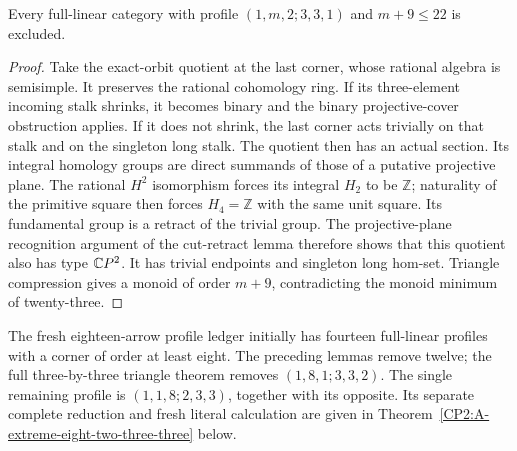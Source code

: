 \begin{proposition}
\label{CP2:A-three-three-two-endpoint}
Every full-linear category with profile
$(1,m,2;3,3,1)$ and $m+9\leq22$ is excluded.
\end{proposition}
\begin{proof}
Take the exact-orbit quotient at the last corner,
whose rational algebra is semisimple. It preserves
the rational cohomology ring. If its three-element
incoming stalk shrinks, it becomes binary and the
binary projective-cover obstruction applies. If
it does not shrink, the last corner acts trivially
on that stalk and on the singleton long stalk.
The quotient then has an actual section. Its integral
homology groups are direct summands of those of a
putative projective plane. The rational $H^2$
isomorphism forces its integral $H_2$ to be $\mathbb Z$;
naturality of the primitive square then forces
$H_4=\mathbb Z$ with the same unit square. Its
fundamental group is a retract of the trivial group.
The projective-plane recognition argument of the
cut-retract lemma therefore shows that this quotient
also has type $\mathbb{C}P^2$.
It has trivial endpoints and singleton long hom-set.
Triangle compression gives a monoid of order $m+9$,
contradicting the monoid minimum of twenty-three.
\end{proof}

\begin{remark*}
The fresh eighteen-arrow profile ledger initially has fourteen
full-linear profiles with a corner of order at least eight.
The preceding lemmas remove twelve; the full three-by-three
triangle theorem removes $(1,8,1;3,3,2)$.
The single remaining profile is $(1,1,8;2,3,3)$, together
with its opposite. Its separate complete reduction and fresh
literal calculation are given in
Theorem~\ref{CP2:A-extreme-eight-two-three-three} below.
\end{remark*}
